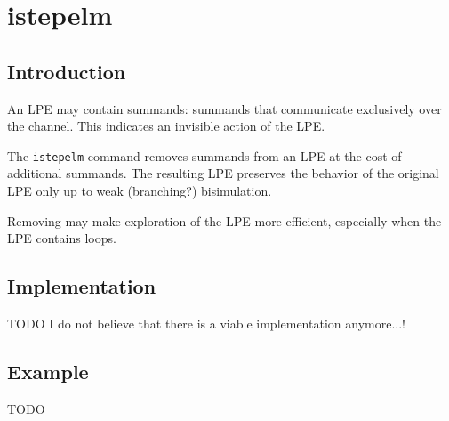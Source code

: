 \chapter{istepelm}

\section{Introduction}

An LPE may contain \istep{} summands: summands that communicate exclusively over the \istep{} channel.
This indicates an invisible action of the LPE.

The \texttt{istepelm} command removes \istep{} summands from an LPE at the cost of additional summands.
The resulting LPE preserves the behavior of the original LPE only up to weak (branching?) bisimulation.

Removing \istep{} may make exploration of the LPE more efficient, especially when the LPE contains \istep{} loops.

\section{Implementation}

TODO I do not believe that there is a viable implementation anymore...!

\section{Example}

TODO
